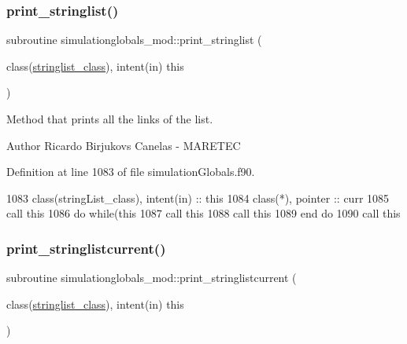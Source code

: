 \subsubsection{\texorpdfstring{print\+\_\+stringlist()}{print\_stringlist()}}
{\footnotesize\ttfamily subroutine simulationglobals\+\_\+mod\+::print\+\_\+stringlist (\begin{DoxyParamCaption}\item[{class(\mbox{\hyperlink{structsimulationglobals__mod_1_1stringlist__class}{stringlist\+\_\+class}}), intent(in)}]{this }\end{DoxyParamCaption})\hspace{0.3cm}{\ttfamily [private]}}



Method that prints all the links of the list. 

\begin{DoxyAuthor}{Author}
Ricardo Birjukovs Canelas -\/ M\+A\+R\+E\+T\+EC 
\end{DoxyAuthor}


Definition at line 1083 of file simulation\+Globals.\+f90.


\begin{DoxyCode}
1083     \textcolor{keywordtype}{class}(stringList\_class), \textcolor{keywordtype}{intent(in)} :: this
1084     \textcolor{keywordtype}{class}(*), \textcolor{keywordtype}{pointer} :: curr
1085     \textcolor{keyword}{call }this%
1086     \textcolor{keywordflow}{do} \textcolor{keywordflow}{while}(this%
1087         \textcolor{keyword}{call }this%
1088         \textcolor{keyword}{call }this%
1089 \textcolor{keywordflow}{    end do}
1090     \textcolor{keyword}{call }this%
\end{DoxyCode}
\mbox{\label{namespacesimulationglobals__mod_a405f70548e38f0af65d4cbdb7c7025a4}} 
\subsubsection{\texorpdfstring{print\+\_\+stringlistcurrent()}{print\_stringlistcurrent()}}
{\footnotesize\ttfamily subroutine simulationglobals\+\_\+mod\+::print\+\_\+stringlistcurrent (\begin{DoxyParamCaption}\item[{class(\mbox{\hyperlink{structsimulationglobals__mod_1_1stringlist__class}{stringlist\+\_\+class}}), intent(in)}]{this }\end{DoxyParamCaption})\hspace{0.3cm}{\ttfamily [private]}}




